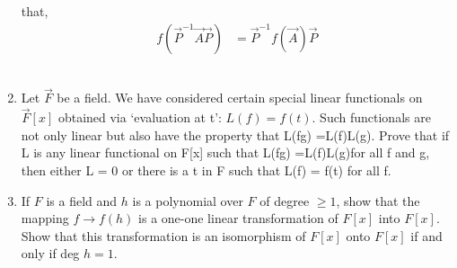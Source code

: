 \begin{enumerate}[label=\thesubsection.\arabic*.,ref=\thesubsection.\theenumi]
that,
\begin{align}
f(\vec{P}^{-1}\vec{A}\vec{P}) &= \vec{P}^{-1}f(\vec{A})\vec{P}
\end{align}
%
\\
\solution

\item Let $\vec{F}$ be a field. We have considered certain special linear functionals on $\vec{F}[x]$
obtained via ‘evaluation at t’:
$L(f) = f(t)$.
Such functionals are not only linear but also have the property that L(fg) =L(f)L(g). Prove that if L is any linear functional on F[x] such that L(fg) =L(f)L(g)for all f and g, then either L = 0 or there is a t in F such that L(f) = f(t) for all f.
%
\\
\solution

\item If $F$ is a field and $h$ is a polynomial over $F$ of degree $\geq 1$,  show that the mapping $f \rightarrow f(h)$ is a one-one linear transformation of $F[x]$ into $F[x]$. Show that this transformation is an isomorphism of $F[x]$ onto $F[x]$ if and only if deg $h = 1$. 
%
\\
\solution

\end{enumerate}
